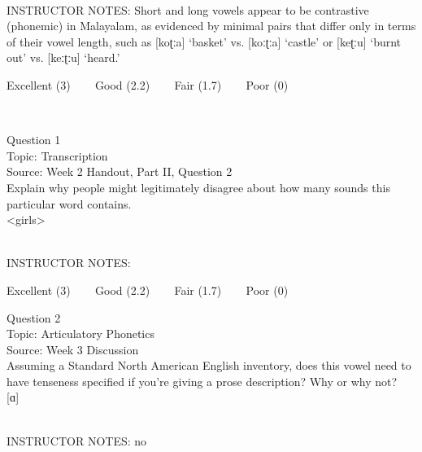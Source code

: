 \documentclass[12pt]{article}
\begin{document}
~\\
INSTRUCTOR NOTES: Short and long vowels appear to be contrastive (phonemic) in Malayalam, as evidenced by minimal pairs that differ only in terms of their vowel length, such as [koʈːa] ‘basket’ vs. [koːʈːa] ‘castle’ or [keʈːu] ‘burnt out’ vs. [keːʈːu] ‘heard.’


\vfill
Excellent (3) ~~~ Good (2.2) ~~~ Fair (1.7) ~~~ Poor (0)
\newpage

\begin{center}
\textbf{{\color{red}{\HUGE END OF EXAM}}}\\

\end{center}
\newpage

\begin{center}
\textbf{{\color{blue}{\HUGE START OF EXAM\\}}}

\textbf{{\color{blue}{\HUGE Student ID: 51557\\}}}

\textbf{{\color{blue}{\HUGE \\}}}

\end{center}
\newpage

{\large Question 1}\\

Topic: Transcription\\
Source: Week 2 Handout, Part II, Question 2\\

Explain why people might legitimately disagree about how many sounds this particular word contains.\\

<girls>


~\\
INSTRUCTOR NOTES: 


\vfill
Excellent (3) ~~~ Good (2.2) ~~~ Fair (1.7) ~~~ Poor (0)
\newpage

{\large Question 2}\\

Topic: Articulatory Phonetics\\
Source: Week 3 Discussion\\

Assuming a Standard North American English inventory, does this vowel need to have tenseness specified if you're giving a prose description? Why or why not?\\

{[ɑ]}


~\\
INSTRUCTOR NOTES: no
\end{document}
